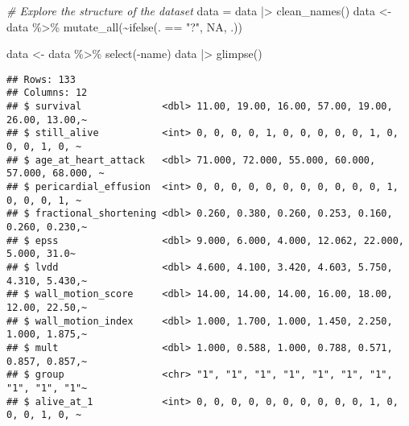\documentclass[
]{article}
\newenvironment{Shaded}{\begin{snugshade}}{\end{snugshade}}
\newcommand{\CommentTok}[1]{\textcolor[rgb]{0.56,0.35,0.01}{\textit{#1}}}
\newcommand{\ConstantTok}[1]{\textcolor[rgb]{0.00,0.00,0.00}{#1}}
\newcommand{\FunctionTok}[1]{\textcolor[rgb]{0.00,0.00,0.00}{#1}}
\newcommand{\NormalTok}[1]{#1}
\newcommand{\OtherTok}[1]{\textcolor[rgb]{0.56,0.35,0.01}{#1}}
\newcommand{\SpecialCharTok}[1]{\textcolor[rgb]{0.00,0.00,0.00}{#1}}
\newcommand{\StringTok}[1]{\textcolor[rgb]{0.31,0.60,0.02}{#1}}
\begin{document}
\begin{Shaded}
\begin{Highlighting}[]
\CommentTok{\# Explore the structure of the dataset}
\NormalTok{data }\OtherTok{=}\NormalTok{ data }\SpecialCharTok{|\textgreater{}} \FunctionTok{clean\_names}\NormalTok{()}
\NormalTok{data }\OtherTok{\textless{}{-}}\NormalTok{ data }\SpecialCharTok{\%\textgreater{}\%}
  \FunctionTok{mutate\_all}\NormalTok{(}\SpecialCharTok{\textasciitilde{}}\FunctionTok{ifelse}\NormalTok{(. }\SpecialCharTok{==} \StringTok{"?"}\NormalTok{, }\ConstantTok{NA}\NormalTok{, .))}

\NormalTok{data }\OtherTok{\textless{}{-}}\NormalTok{ data }\SpecialCharTok{\%\textgreater{}\%}
  \FunctionTok{select}\NormalTok{(}\SpecialCharTok{{-}}\NormalTok{name)}
\NormalTok{data }\SpecialCharTok{|\textgreater{}} \FunctionTok{glimpse}\NormalTok{()}
\end{Highlighting}
\end{Shaded}

\begin{verbatim}
## Rows: 133
## Columns: 12
## $ survival              <dbl> 11.00, 19.00, 16.00, 57.00, 19.00, 26.00, 13.00,~
## $ still_alive           <int> 0, 0, 0, 0, 1, 0, 0, 0, 0, 0, 1, 0, 0, 0, 1, 0, ~
## $ age_at_heart_attack   <dbl> 71.000, 72.000, 55.000, 60.000, 57.000, 68.000, ~
## $ pericardial_effusion  <int> 0, 0, 0, 0, 0, 0, 0, 0, 0, 0, 0, 1, 0, 0, 0, 1, ~
## $ fractional_shortening <dbl> 0.260, 0.380, 0.260, 0.253, 0.160, 0.260, 0.230,~
## $ epss                  <dbl> 9.000, 6.000, 4.000, 12.062, 22.000, 5.000, 31.0~
## $ lvdd                  <dbl> 4.600, 4.100, 3.420, 4.603, 5.750, 4.310, 5.430,~
## $ wall_motion_score     <dbl> 14.00, 14.00, 14.00, 16.00, 18.00, 12.00, 22.50,~
## $ wall_motion_index     <dbl> 1.000, 1.700, 1.000, 1.450, 2.250, 1.000, 1.875,~
## $ mult                  <dbl> 1.000, 0.588, 1.000, 0.788, 0.571, 0.857, 0.857,~
## $ group                 <chr> "1", "1", "1", "1", "1", "1", "1", "1", "1", "1"~
## $ alive_at_1            <int> 0, 0, 0, 0, 0, 0, 0, 0, 0, 0, 1, 0, 0, 0, 1, 0, ~
\end{verbatim}
\end{document}
